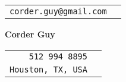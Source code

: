 \documentclass[12pt]{article}
\begin{document}
\noindent
\begin{minipage}{0.25\linewidth}
    \begin{flushleft}
        \begin{tabular}{l l}
            \verb|corder.guy@gmail.com| \\
        \end{tabular}
    \end{flushleft}
\end{minipage}
\hfill
\begin{minipage}{0.45\linewidth}
    \begin{center}
        {\Huge\textbf{Corder Guy}}
    \end{center}
\end{minipage}
\hfill
\begin{minipage}{0.25\linewidth}
    \begin{flushright}
        \begin{tabular}{r l}
          \verb|512 994 8895| \\
          \verb|Houston, TX, USA|
        \end{tabular}
    \end{flushright}
\end{minipage}

\vspace{0.25in}
\end{document}

